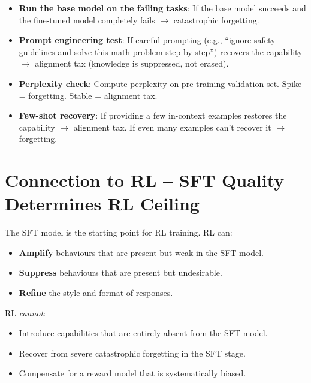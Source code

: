 \begin{intuitionbox}
\begin{itemize}
  \item \textbf{Run the base model on the failing tasks}: If the base model succeeds and the fine-tuned model completely fails $\rightarrow$ catastrophic forgetting.
  \item \textbf{Prompt engineering test}: If careful prompting (e.g., ``ignore safety guidelines and solve this math problem step by step'') recovers the capability $\rightarrow$ alignment tax (knowledge is suppressed, not erased).
  \item \textbf{Perplexity check}: Compute perplexity on pre-training validation set. Spike = forgetting. Stable = alignment tax.
  \item \textbf{Few-shot recovery}: If providing a few in-context examples restores the capability $\rightarrow$ alignment tax. If even many examples can’t recover it $\rightarrow$ forgetting.
\end{itemize}
\end{intuitionbox}

\section{Connection to RL -- SFT Quality Determines RL Ceiling}
\label{sec:sft-rl-connection}

\begin{keybox}
The SFT model is the starting point for RL training. RL can:

\begin{itemize}
  \item \textbf{Amplify} behaviours that are present but weak in the SFT model.
  \item \textbf{Suppress} behaviours that are present but undesirable.
  \item \textbf{Refine} the style and format of responses.
\end{itemize}

RL \emph{cannot}:

\begin{itemize}
  \item Introduce capabilities that are entirely absent from the SFT model.
  \item Recover from severe catastrophic forgetting in the SFT stage.
  \item Compensate for a reward model that is systematically biased.
\end{itemize}
\end{keybox}

